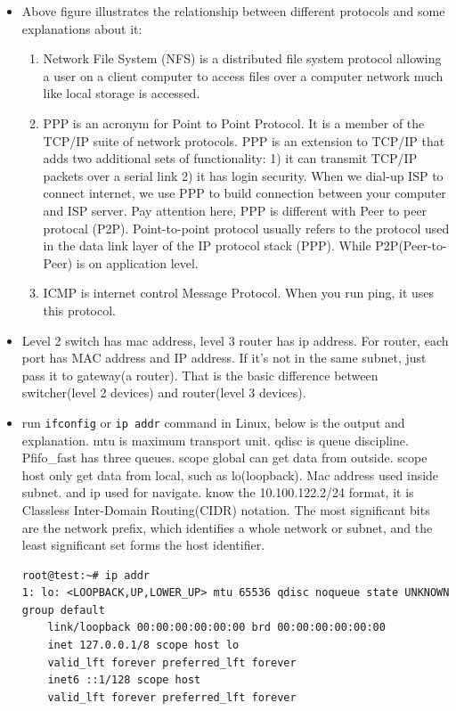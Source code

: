 \documentclass[a4paper,11pt,twoside]{book}
\begin{document}
\begin{itemize}
		\item Above figure illustrates the relationship between different protocols and some explanations about it:
	\begin{enumerate}
		\item Network File System (NFS) is a distributed file system protocol allowing a user on a client computer to access files over a computer network much like local storage is accessed.
		
		\item PPP is an acronym for Point to Point Protocol. It is a member of the TCP/IP suite of network protocols. PPP is an extension to TCP/IP that adds two additional sets of functionality: 1) it can transmit TCP/IP packets over a serial link 2) it has login security. 
		When we dial-up ISP to connect internet, we use PPP to build connection between your computer and ISP server. Pay attention here, PPP is different with Peer to peer protocal (P2P). Point-to-point protocol usually refers to the protocol used in the data link layer of the IP protocol stack (PPP). While P2P(Peer-to-Peer) is on application level. 	
		
		\item  ICMP is internet control Message Protocol. When you run ping, it uses this protocol. 
			
		
	\end{enumerate}

	
	\item Level 2 switch has mac address, level 3 router has ip address. For router, each port has MAC address and IP address. If it's not in the same subnet, just pass it to gateway(a router). That is the basic difference between switcher(level 2 devices) and router(level 3 devices). 
	
	\item run \texttt{ifconfig} or \texttt{ip addr} command in Linux, below is the output and explanation. mtu is maximum transport unit. qdisc is queue discipline.  Pfifo\_fast has three queues. scope global can get data from outside. scope host only get data from local, such as lo(loopback). Mac address used inside subnet. and ip used for navigate.  know the 10.100.122.2/24 format, it is Classless Inter-Domain Routing(CIDR) notation. The most significant bits are the network prefix, which identifies a whole network or subnet, and the least significant set forms the host identifier.
\begin{lstlisting}
root@test:~# ip addr
1: lo: <LOOPBACK,UP,LOWER_UP> mtu 65536 qdisc noqueue state UNKNOWN group default
	link/loopback 00:00:00:00:00:00 brd 00:00:00:00:00:00
	inet 127.0.0.1/8 scope host lo
	valid_lft forever preferred_lft forever
	inet6 ::1/128 scope host
	valid_lft forever preferred_lft forever


\end{lstlisting}
\end{itemize}
\end{document}
